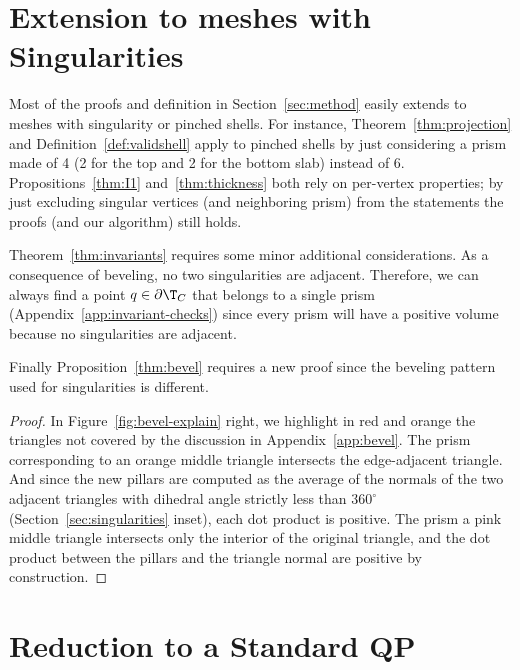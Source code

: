 \section{Extension to meshes with Singularities}\label{app:singularity}
Most of the proofs and definition in Section~\ref{sec:method} easily extends to meshes with singularity or pinched shells. For instance,
 Theorem~\ref{thm:projection} and Definition~\ref{def:validshell} apply to pinched shells by just considering a prism made of 4 (2 for the top and 2 for the bottom slab) instead of 6. Propositions~\ref{thm:I1} and~\ref{thm:thickness} both rely on per-vertex properties; by just excluding singular vertices (and neighboring prism) from the statements the proofs (and our algorithm) still holds.


Theorem~\ref{thm:invariants} requires some minor additional considerations. As a consequence of beveling, no two singularities are adjacent. Therefore, we can always find a point $q \in \partial \T_C$ that belongs to a single prism (Appendix~\ref{app:invariant-checks}) since every prism will have a positive volume
because no singularities are adjacent.


Finally Proposition~\ref{thm:bevel} requires a new proof since the beveling pattern used for singularities is different.
\begin{proof}
In  Figure~\ref{fig:bevel-explain} right, we highlight in red and orange the triangles not covered by the discussion in Appendix~\ref{app:bevel}. 
The prism corresponding to an orange middle triangle intersects the edge-adjacent triangle. And since the new pillars are computed as the average of the normals of the two adjacent triangles with dihedral angle strictly less than $360^\circ$ 
 (Section~\ref{sec:singularities} inset), each dot product is positive. 
The prism  a pink middle triangle intersects only the interior of the original triangle, and the dot product between the pillars and the triangle normal are positive by construction. %
\end{proof}



\section{Reduction to a Standard QP}
\label{app:qp}

